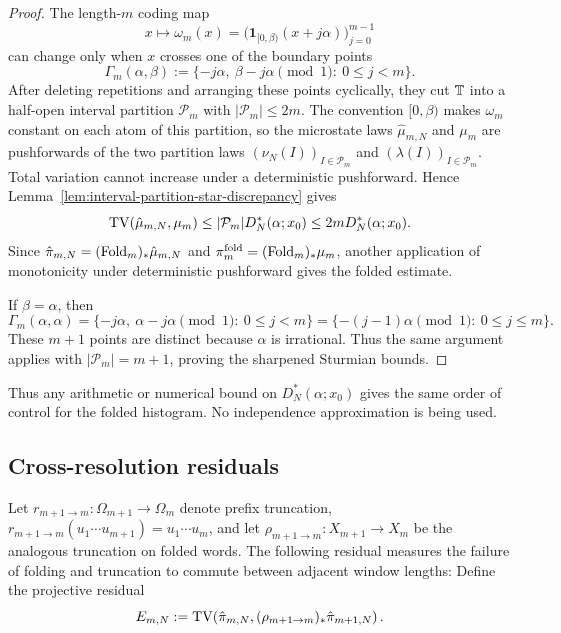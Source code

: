 \begin{proof}
The length-\(m\) coding map
\[
x\longmapsto \omega_m(x)
=\bigl(\mathbf 1_{[0,\beta)}(x+j\alpha)\bigr)_{j=0}^{m-1}
\]
can change only when \(x\) crosses one of the boundary points
\[
\Gamma_m(\alpha,\beta)
:=\{-j\alpha,\ \beta-j\alpha \pmod 1:\ 0\le j<m\}.
\]
After deleting repetitions and arranging these points cyclically, they cut
\(\mathbb{T}\) into a half-open interval partition \(\mathcal P_m\) with
\(|\mathcal P_m|\le 2m\).  The convention \([0,\beta)\) makes
\(\omega_m\) constant on each atom of this partition, so the microstate laws
\(\hat\mu_{m,N}\) and \(\mu_m\) are pushforwards of the two partition laws
\((\nu_N(I))_{I\in\mathcal P_m}\) and \((\lambda(I))_{I\in\mathcal P_m}\).
Total variation cannot increase under a deterministic pushforward.  Hence
Lemma~\ref{lem:interval-partition-star-discrepancy} gives
\[
\operatorname{TV}(\hat\mu_{m,N},\mu_m)
\le |\mathcal P_m|D_N^*(\alpha;x_0)
\le 2mD_N^*(\alpha;x_0).
\]
Since \(\hat\pi_{m,N}=(\mathrm{Fold}_m)_*\hat\mu_{m,N}\) and
\(\pi_m^{\mathrm{fold}}=(\mathrm{Fold}_m)_*\mu_m\), another application of
monotonicity under deterministic pushforward gives the folded estimate.

If \(\beta=\alpha\), then
\[
\Gamma_m(\alpha,\alpha)
=\{-j\alpha,\ \alpha-j\alpha \pmod 1:\ 0\le j<m\}
=\{-(j-1)\alpha\pmod 1:\ 0\le j\le m\}.
\]
These \(m+1\) points are distinct because \(\alpha\) is irrational.  Thus the
same argument applies with \(|\mathcal P_m|=m+1\), proving the sharpened
Sturmian bounds.
\end{proof}

\begin{remark}
Thus any arithmetic or numerical bound on \(D_N^*(\alpha;x_0)\) gives the same
order of control for the folded histogram.  No independence approximation is
being used.
\end{remark}

\subsection{Cross-resolution residuals}

Let $r_{m+1\to m}:\Omega_{m+1}\to\Omega_m$ denote prefix truncation,
$r_{m+1\to m}(u_1\cdots u_{m+1})=u_1\cdots u_m$, and let
$\rho_{m+1\to m}:X_{m+1}\to X_m$ be the analogous truncation on folded words.
The following residual measures the failure of folding and truncation to
commute between adjacent window lengths:
Define the projective residual
\[
E_{m,N}
:=
\operatorname{TV}\!\left(\hat\pi_{m,N},(\rho_{m+1\to m})_*\hat\pi_{m+1,N}\right).
\]

